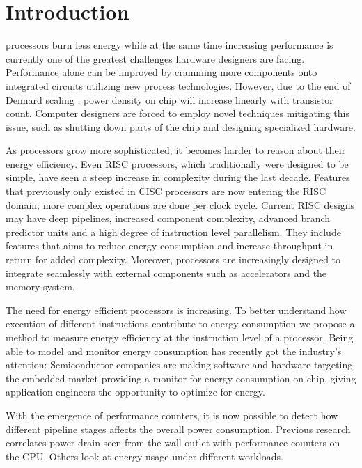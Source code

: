 \section{Introduction}

 processors burn less energy while at the same time
increasing performance is currently one of the greatest challenges hardware
designers are facing. Performance alone can be improved by cramming more
components onto integrated circuits \cite{moore1965cramming} utilizing new
process technologies. However, due to the end of Dennard scaling \cite{frank2001device},
power density on chip will increase linearly with transistor count. Computer
designers are forced to employ novel techniques mitigating this issue, such as
shutting down parts of the chip \cite{esmaeilzadeh2011dark} and designing
specialized hardware.

As processors grow more sophisticated, it becomes harder to reason about their
energy efficiency. Even RISC processors, which traditionally were designed to
be simple\cite{sivarama}, have seen a steep increase in complexity during the
last decade\cite{alf_egil_bogen_cisc_risc_blog}. Features that previously only
existed in CISC processors are now entering the RISC domain; more complex
operations are done per clock cycle. Current RISC designs may have deep
pipelines, increased component complexity, advanced branch predictor units and a
high degree of instruction level parallelism. They include features that aims to
reduce energy consumption and increase throughput in return for added
complexity. Moreover, processors are increasingly designed to integrate
seamlessly with external components such as accelerators and the memory system.

The need for energy efficient processors is increasing. To better understand how
execution of different instructions contribute to energy consumption we propose
a method to measure energy efficiency at the instruction level of a processor.
Being able to model and monitor energy consumption has recently got the
industry's attention: Semiconductor companies are making software and hardware
targeting the embedded market providing a monitor for energy consumption
on-chip, giving application engineers the opportunity to optimize for energy.

With the emergence of performance counters, it is now possible to detect how
different pipeline stages affects the overall power consumption. Previous
research correlates power drain seen from the wall outlet with performance
counters on the CPU\cite{singh,bertran,bircher}. Others look at
energy usage under different workloads\cite{carroll2010analysis}.

